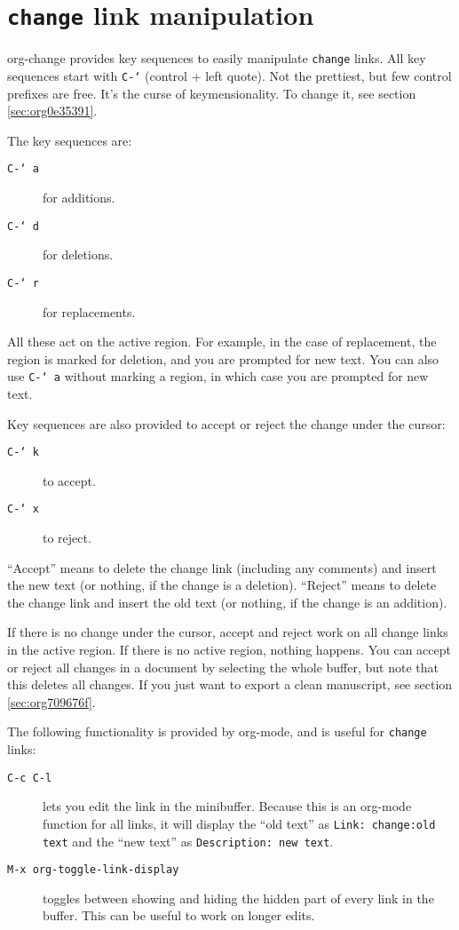 \documentclass[11pt]{article}
\begin{document}
\section{\texttt{change} link manipulation}
\label{sec:org364c7f1}

org-change provides key sequences to easily manipulate \texttt{change}
links. All key sequences start with \texttt{C-`} (control + left quote). Not
the prettiest, but few control prefixes are free. It's the curse of
keymensionality. To change it, see section \ref{sec:org0e35391}.

The key sequences are:
\begin{description}
\item[{\texttt{C-` a}}] for additions.
\item[{\texttt{C-` d}}] for deletions.
\item[{\texttt{C-` r}}] for replacements.
\end{description}
All these act on the active region. For example, in the case of
replacement, the region is marked for deletion, and you are prompted
for new text. You can also use \texttt{C-` a} without marking a region, in
which case you are prompted for new text.

Key sequences are also provided to accept or reject the change under
the cursor:
\begin{description}
\item[{\texttt{C-` k}}] to accept.
\item[{\texttt{C-` x}}] to reject.
\end{description}
``Accept'' means to delete the change link (including any comments) and
insert the new text (or nothing, if the change is a
deletion). ``Reject'' means to delete the change link and insert the old
text (or nothing, if the change is an addition). 

If there is no change under the cursor, accept and reject work on all
change links in the active region. If there is no active region,
nothing happens. You can accept or reject all changes in a document by
selecting the whole buffer, but note that this deletes all changes. If
you just want to export a clean manuscript, see section \ref{sec:org709676f}.

The following functionality is provided by org-mode, and is useful for
\texttt{change} links:
\begin{description}
\item[{\texttt{C-c C-l}}] lets you edit the link in the minibuffer. Because this
is an org-mode function for all links, it will display the ``old
text'' as \texttt{Link: change:old text} and the ``new text'' as \texttt{Description: new text}.
\item[{\texttt{M-x org-toggle-link-display}}] toggles between showing and hiding
the hidden part of every link in the buffer. This can be useful to
work on longer edits.
\end{description}
\end{document}
